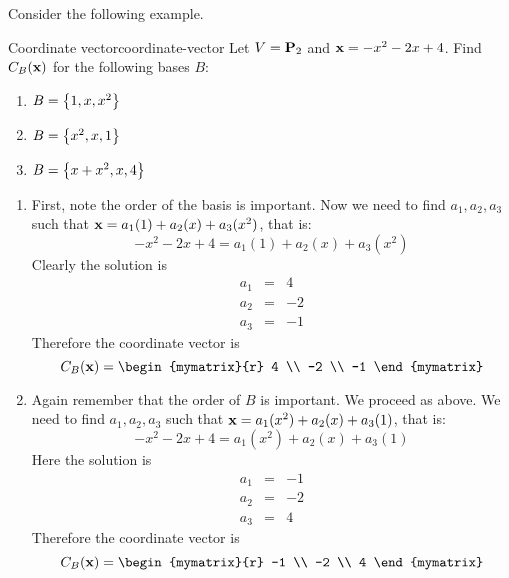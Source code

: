 Consider the following example.

\begin{example}{Coordinate vector}{coordinate-vector}
  Let $V = \mathbf{P}_2$ and $\mbox{\bf x} = -x^2 -2x + 4$.
  Find $C_B(\mbox{\bf x})$ for the following bases $B$:
  \begin{enumerate}
  \item $B = \left\{1, x, x^2 \right\}$
  \item $B = \left\{x^2, x, 1 \right\}$
  \item $B = \left\{x + x^2 , x , 4 \right\}$
  \end{enumerate}
\end{example}

\begin{solution}
  \begin{enumerate}
  \item First, note the order of the basis is important.  Now we need
    to find $a_1, a_2, a_3$ such that
    $\mbox{\bf x} = a_1 (1) + a_2 (x) + a_3(x^2)$, that is:
    \begin{equation*}
      -x^2 -2x + 4 = a_1 (1) + a_2 (x) + a_3(x^2)
    \end{equation*}
    Clearly the solution is
    \begin{eqnarray*}
      a_1 &=& 4 \\
      a_2 &=& -2 \\
      a_3 &=& -1
    \end{eqnarray*}
    Therefore the coordinate vector is
    \begin{equation*}
      C_B(\vect{x}) =
      \begin{mymatrix}{r}
        4 \\
        -2 \\
        -1
      \end{mymatrix}
    \end{equation*}

  \item Again remember that the order of $B$ is important. We proceed
    as above.  We need to find $a_1, a_2, a_3$ such that
    $\mbox{\bf x} = a_1 (x^2) + a_2 (x) + a_3(1)$, that is:
    \begin{equation*}
      -x^2 -2x + 4 = a_1 (x^2) + a_2 (x) + a_3(1)
    \end{equation*}
    Here the solution is
    \begin{eqnarray*}
      a_1 &=& -1 \\
      a_2 &=& -2 \\
      a_3 &=& 4
    \end{eqnarray*}
    Therefore the coordinate vector is
    \begin{equation*}
      C_B(\vect{x}) =
      \begin{mymatrix}{r}
        -1 \\
        -2 \\
        4
      \end{mymatrix}
    \end{equation*}


\end{enumerate}
\end{solution}
